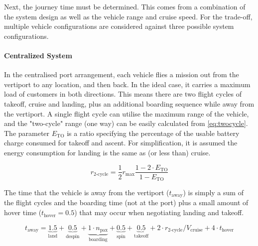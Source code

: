 Next, the journey time must be determined. This comes from a combination of the system design as well as the vehicle range and cruise speed. For the trade-off, multiple vehicle configurations are considered against three possible system configurations.

\paragraph{Centralized System}
In the centralised port arrangement, each vehicle flies a mission out from the vertiport to any location, and then back. In the ideal case, it carries a maximum load of customers in both directions. This means there are two flight cycles of takeoff, cruise and landing, plus an additional boarding sequence while away from the vertiport.
A single flight cycle can utilise the maximum range of the vehicle, and the "two-cycle" range (one way) can be easily calculated from \autoref{eq:twocycle}. The parameter $E_\text{TO}$ is a ratio specifying the percentage of the usable battery charge consumed for takeoff and ascent. For simplification, it is assumed the energy consumption for landing is the same as (or less than) cruise.

\begin{equation}\label{eq:twocycle}
    r_\text{2-cycle} = \frac{1}{2}r_\text{max}\frac{1 - 2\cdot E_\text{TO}}{1 - E_\text{TO}}
\end{equation}


The time that the vehicle is away from the vertiport ($t_\text{away}$) is simply a sum of the flight cycles and the boarding time (not at the port) plus a small amount of hover time ($t_\text{hover}=0.5$) that may occur when negotiating landing and takeoff.

\begin{equation}\label{eq:boardingOffport}
    t_\text{away} = \underbrace{1.5}_\text{land}+\underbrace{0.5}_\text{despin}+\underbrace{1\cdot n_\text{pax}}_\text{boarding} +\underbrace{0.5}_\text{spin}+\underbrace{0.5}_\text{takeoff} + 2\cdot r_\text{2-cycle}/V_\text{cruise} + 4\cdot t_\text{hover}
\end{equation}

